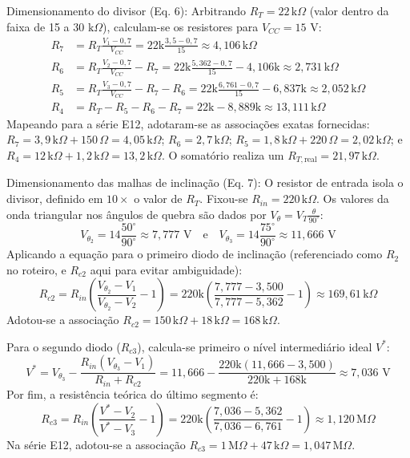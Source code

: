 \documentclass[11pt,a4paper]{article}
\begin{document}
\begin{itemize}
    Dimensionamento do divisor (Eq. 6): Arbitrando $R_T = 22\,\mathrm{k}\Omega$ (valor dentro da faixa de 15 a 30 $\mathrm{k}\Omega$), calculam-se os resistores para $V_{CC} = 15\text{ V}$:
    \begin{align*}
        R_7 &= R_T \frac{V_1 - 0{,}7}{V_{CC}} = 22\text{k} \frac{3{,}5 - 0{,}7}{15} \approx 4{,}106\,\mathrm{k}\Omega \\
        R_6 &= R_T \frac{V_2 - 0{,}7}{V_{CC}} - R_7 = 22\text{k} \frac{5{,}362 - 0{,}7}{15} - 4{,}106\text{k} \approx 2{,}731\,\mathrm{k}\Omega \\
        R_5 &= R_T \frac{V_3 - 0{,}7}{V_{CC}} - R_7 - R_6 = 22\text{k} \frac{6{,}761 - 0{,}7}{15} - 6{,}837\text{k} \approx 2{,}052\,\mathrm{k}\Omega \\
        R_4 &= R_T - R_5 - R_6 - R_7 = 22\text{k} - 8{,}889\text{k} \approx 13{,}111\,\mathrm{k}\Omega
    \end{align*}
    Mapeando para a série E12, adotaram-se as associações exatas fornecidas: $R_7 = 3{,}9\,\mathrm{k}\Omega + 150\,\Omega = 4{,}05\,\mathrm{k}\Omega$; $R_6 = 2{,}7\,\mathrm{k}\Omega$; $R_5 = 1{,}8\,\mathrm{k}\Omega + 220\,\Omega = 2{,}02\,\mathrm{k}\Omega$; e $R_4 = 12\,\mathrm{k}\Omega + 1{,}2\,\mathrm{k}\Omega = 13{,}2\,\mathrm{k}\Omega$. O somatório realiza um $R_{T,\text{real}} = 21{,}97\,\mathrm{k}\Omega$.

    Dimensionamento das malhas de inclinação (Eq. 7): O resistor de entrada isola o divisor, definido em $10\times$ o valor de $R_T$. Fixou-se $R_{in} = 220\,\mathrm{k}\Omega$. Os valores da onda triangular nos ângulos de quebra são dados por $V_\theta = V_T \frac{\theta}{90^\circ}$:
    \[ V_{\theta_2} = 14 \frac{50^\circ}{90^\circ} \approx 7{,}777\text{ V} \quad \text{e} \quad V_{\theta_3} = 14 \frac{75^\circ}{90^\circ} \approx 11{,}666\text{ V} \]
    Aplicando a equação para o primeiro diodo de inclinação (referenciado como $R_2$ no roteiro, e $R_{c2}$ aqui para evitar ambiguidade):
    \[ R_{c2} = R_{in} \left( \frac{V_{\theta_2} - V_1}{V_{\theta_2} - V_2} - 1 \right) = 220\text{k} \left( \frac{7{,}777 - 3{,}500}{7{,}777 - 5{,}362} - 1 \right) \approx 169{,}61\,\mathrm{k}\Omega \]
    Adotou-se a associação $R_{c2} = 150\,\mathrm{k}\Omega + 18\,\mathrm{k}\Omega = 168\,\mathrm{k}\Omega$.
    
    Para o segundo diodo ($R_{c3}$), calcula-se primeiro o nível intermediário ideal $V^*$:
    \[ V^* = V_{\theta_3} - \frac{R_{in}(V_{\theta_3} - V_1)}{R_{in} + R_{c2}} = 11{,}666 - \frac{220\text{k}(11{,}666 - 3{,}500)}{220\text{k} + 168\text{k}} \approx 7{,}036\text{ V} \]
    Por fim, a resistência teórica do último segmento é:
    \[ R_{c3} = R_{in} \left( \frac{V^* - V_2}{V^* - V_3} - 1 \right) = 220\text{k} \left( \frac{7{,}036 - 5{,}362}{7{,}036 - 6{,}761} - 1 \right) \approx 1{,}120\,\mathrm{M}\Omega \]
    Na série E12, adotou-se a associação $R_{c3} = 1\,\mathrm{M}\Omega + 47\,\mathrm{k}\Omega = 1{,}047\,\mathrm{M}\Omega$.

\end{itemize}
\end{document}
